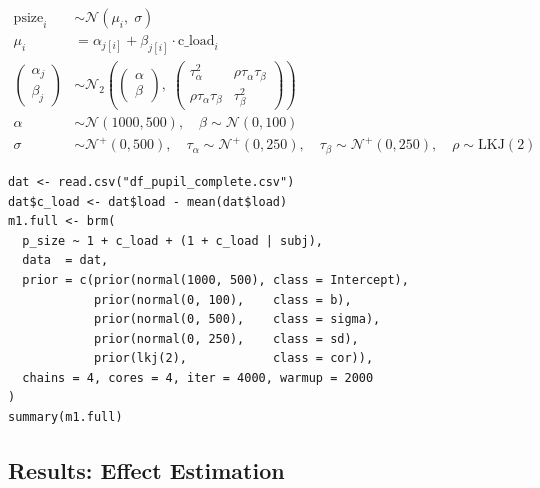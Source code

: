 \documentclass[12pt,a4paper]{article}
\begin{document}
\begin{tcolorbox}[modelbox]
\begin{align}
  \text{psize}_i &\sim \mathcal{N}(\mu_i,\;\sigma) \nonumber \\
  \mu_i &= \alpha_{j[i]} + \beta_{j[i]}\cdot\text{c\_load}_i \nonumber \\[4pt]
  \begin{pmatrix}\alpha_j\\\beta_j\end{pmatrix}
  &\sim \mathcal{N}_2\!\left(
    \begin{pmatrix}\alpha\\\beta\end{pmatrix},\;
    \begin{pmatrix}\tau_\alpha^2 & \rho\tau_\alpha\tau_\beta\\
                   \rho\tau_\alpha\tau_\beta & \tau_\beta^2\end{pmatrix}
  \right) \nonumber \\[4pt]
  \alpha &\sim \mathcal{N}(1000,500),\quad \beta\sim\mathcal{N}(0,100) \nonumber \\
  \sigma &\sim\mathcal{N}^+(0,500),\quad
  \tau_\alpha\sim\mathcal{N}^+(0,250),\quad
  \tau_\beta\sim\mathcal{N}^+(0,250),\quad
  \rho\sim\mathrm{LKJ}(2) \nonumber
\end{align}
\end{tcolorbox}
\vspace{48pt}
\begin{lstlisting}
dat <- read.csv("df_pupil_complete.csv")
dat$c_load <- dat$load - mean(dat$load)
m1.full <- brm(
  p_size ~ 1 + c_load + (1 + c_load | subj),
  data  = dat,
  prior = c(prior(normal(1000, 500), class = Intercept),
            prior(normal(0, 100),    class = b),
            prior(normal(0, 500),    class = sigma),
            prior(normal(0, 250),    class = sd),
            prior(lkj(2),            class = cor)),
  chains = 4, cores = 4, iter = 4000, warmup = 2000
)
summary(m1.full)
\end{lstlisting}
\newpage
\subsection{Results: Effect Estimation}
\end{document}
